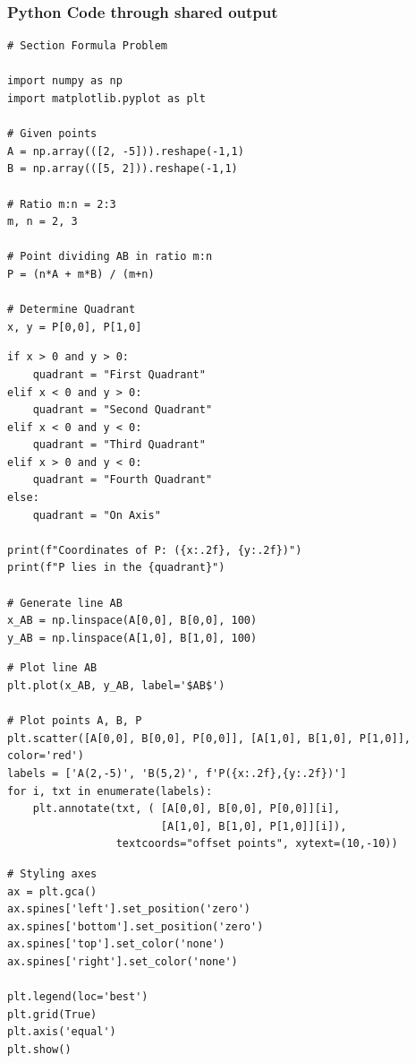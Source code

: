 \documentclass{beamer}
\begin{document}
\begin{frame}[fragile]
	\frametitle{Python Code through shared output}
	\begin{lstlisting}
# Section Formula Problem

import numpy as np
import matplotlib.pyplot as plt

# Given points
A = np.array(([2, -5])).reshape(-1,1)
B = np.array(([5, 2])).reshape(-1,1)

# Ratio m:n = 2:3
m, n = 2, 3

# Point dividing AB in ratio m:n
P = (n*A + m*B) / (m+n)

# Determine Quadrant
x, y = P[0,0], P[1,0]
	\end{lstlisting}
\end{frame}

\begin{frame}[fragile]
	\begin{lstlisting}
if x > 0 and y > 0:
    quadrant = "First Quadrant"
elif x < 0 and y > 0:
    quadrant = "Second Quadrant"
elif x < 0 and y < 0:
    quadrant = "Third Quadrant"
elif x > 0 and y < 0:
    quadrant = "Fourth Quadrant"
else:
    quadrant = "On Axis"

print(f"Coordinates of P: ({x:.2f}, {y:.2f})")
print(f"P lies in the {quadrant}")

# Generate line AB
x_AB = np.linspace(A[0,0], B[0,0], 100)
y_AB = np.linspace(A[1,0], B[1,0], 100)

	\end{lstlisting}
\end{frame}

\begin{frame}[fragile]
	
	\begin{lstlisting}
# Plot line AB
plt.plot(x_AB, y_AB, label='$AB$')

# Plot points A, B, P
plt.scatter([A[0,0], B[0,0], P[0,0]], [A[1,0], B[1,0], P[1,0]], color='red')
labels = ['A(2,-5)', 'B(5,2)', f'P({x:.2f},{y:.2f})']
for i, txt in enumerate(labels):
    plt.annotate(txt, ( [A[0,0], B[0,0], P[0,0]][i],
                        [A[1,0], B[1,0], P[1,0]][i]),
                 textcoords="offset points", xytext=(10,-10))
	\end{lstlisting}
\end{frame}
\begin{frame}[fragile]
	
	\begin{lstlisting}
# Styling axes
ax = plt.gca()
ax.spines['left'].set_position('zero')
ax.spines['bottom'].set_position('zero')
ax.spines['top'].set_color('none')
ax.spines['right'].set_color('none')

plt.legend(loc='best')
plt.grid(True)
plt.axis('equal')
plt.show()

	\end{lstlisting}
\end{frame}
\end{document}
